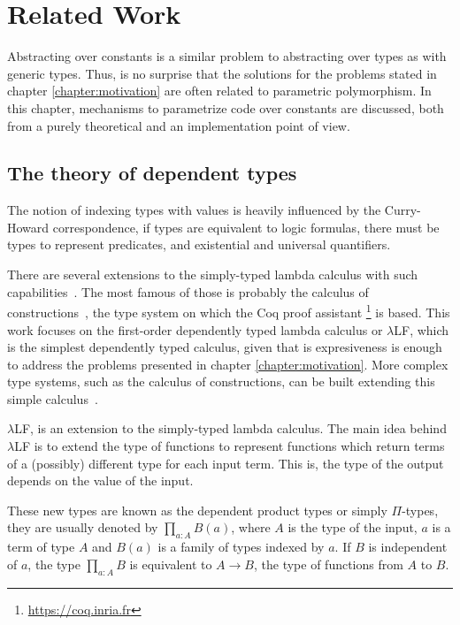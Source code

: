 \newcommand{\pdtn}[1] { \langle \text{#1} \rangle }

\chapter{Related Work}

\label{chapter:related_work}

Abstracting over constants is a similar problem to abstracting over types as
with generic types. Thus, is no surprise that the solutions for the problems
stated in chapter \ref{chapter:motivation} are often related to parametric
polymorphism. In this chapter, mechanisms to parametrize code over constants are
discussed, both from a purely theoretical and an implementation point of view.

\section{The theory of dependent types} 

The notion of indexing types with values is heavily influenced by the
Curry-Howard correspondence, if types are equivalent to logic formulas, there
must be types to represent predicates, and existential and universal
quantifiers.

There are several extensions to the simply-typed lambda calculus with such
capabilities~\cite{pierce}. The most famous of those is probably the calculus of
constructions~\cite{coc}, the type system on which the Coq proof assistant
\footnote{\url{https://coq.inria.fr}} is based. This work focuses on the first-order
dependently typed lambda calculus or $\lambda$LF, which is the simplest
dependently typed calculus, given that is expresiveness is enough to address the
problems presented in chapter \ref{chapter:motivation}. More complex type
systems, such as the calculus of constructions, can be built extending this
simple calculus~\cite{pierce}.

$\lambda$LF, is an extension to the simply-typed lambda calculus. The main idea
behind $\lambda$LF is to extend the type of functions to represent functions
which return terms of a (possibly) different type for each input term. This is,
the type of the output depends on the value of the input.

These new types are known as the dependent product types or simply $\Pi$-types,
they are usually denoted by $\prod_{a:A} B(a)$, where $A$ is the type of the
input, $a$ is a term of type $A$ and $B(a)$ is a family of types indexed by $a$.
If $B$ is independent of $a$, the type $\prod_{a:A} B$ is equivalent to $A
\rightarrow B$, the type of functions from $A$ to $B$.

